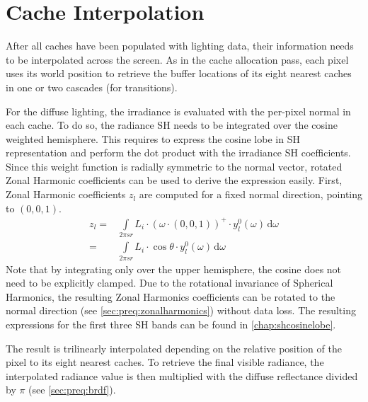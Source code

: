 \documentclass[thesis.tex]{subfiles}
\begin{document}
\section{Cache Interpolation}
After all caches have been populated with lighting data, their information needs to be interpolated across the screen.
As in the cache allocation pass, each pixel uses its world position to retrieve the buffer locations of its eight nearest caches in one or two cascades (for transitions).
 
For the diffuse lighting, the irradiance is evaluated with the per-pixel normal in each cache.
To do so, the radiance SH needs to be integrated over the cosine weighted hemisphere.
This requires to express the cosine lobe in SH representation and perform the dot product with the irradiance SH coefficients.
Since this weight function is radially symmetric to the normal vector, rotated Zonal Harmonic coefficients can be used to derive the expression easily.
First, Zonal Harmonic coefficients $z_l$ are computed for a fixed normal direction, pointing to $(0,0,1)$.
\begin{align}
z_l =&\int\limits_{2 \pi sr} L_i \cdot (\omega \cdot (0,0,1))^+ \cdot y^0_l(\omega) \,\mathrm{d}\omega\\
=&\int\limits_{2 \pi sr} L_i \cdot \cos\theta \cdot y^0_l(\omega) \,\mathrm{d}\omega
\end{align}
Note that by integrating only over the upper hemisphere, the cosine does not need to be explicitly clamped.
Due to the rotational invariance of Spherical Harmonics, the resulting Zonal Harmonics coefficients can be rotated to the normal direction (see \autoref{sec:preq:zonalharmonics}) without data loss.
The resulting expressions for the first three SH bands can be found in \autoref{chap:shcosinelobe}.

The result is trilinearly interpolated depending on the relative position of the pixel to its eight nearest caches.
To retrieve the final visible radiance, the interpolated radiance value is then multiplied with the diffuse reflectance divided by $\pi$ (see \autoref{sec:preq:brdf}).
\end{document}
